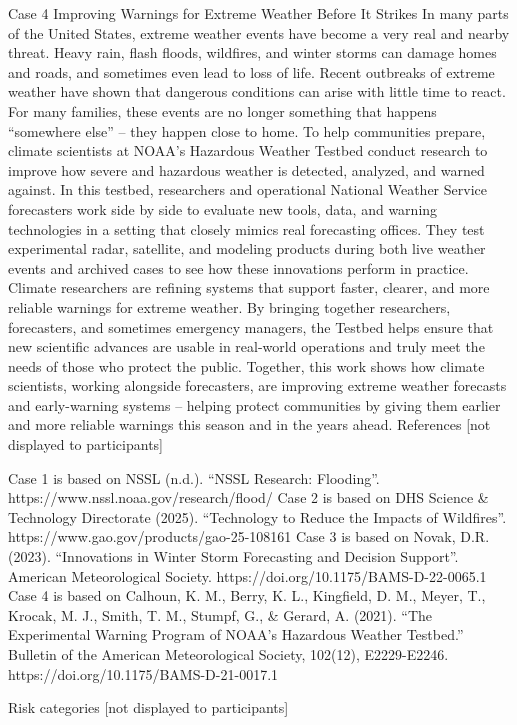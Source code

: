 \documentclass[
  letterpaper,
  DIV=11,
  numbers=noendperiod]{scrartcl}
\begin{document}
Case 4 Improving Warnings for Extreme Weather Before It Strikes In many
parts of the United States, extreme weather events have become a very
real and nearby threat. Heavy rain, flash floods, wildfires, and winter
storms can damage homes and roads, and sometimes even lead to loss of
life. Recent outbreaks of extreme weather have shown that dangerous
conditions can arise with little time to react. For many families, these
events are no longer something that happens ``somewhere else'' -- they
happen close to home. To help communities prepare, climate scientists at
NOAA's Hazardous Weather Testbed conduct research to improve how severe
and hazardous weather is detected, analyzed, and warned against. In this
testbed, researchers and operational National Weather Service
forecasters work side by side to evaluate new tools, data, and warning
technologies in a setting that closely mimics real forecasting offices.
They test experimental radar, satellite, and modeling products during
both live weather events and archived cases to see how these innovations
perform in practice. Climate researchers are refining systems that
support faster, clearer, and more reliable warnings for extreme weather.
By bringing together researchers, forecasters, and sometimes emergency
managers, the Testbed helps ensure that new scientific advances are
usable in real-world operations and truly meet the needs of those who
protect the public. Together, this work shows how climate scientists,
working alongside forecasters, are improving extreme weather forecasts
and early-warning systems -- helping protect communities by giving them
earlier and more reliable warnings this season and in the years ahead.
References {[}not displayed to participants{]}

Case 1 is based on NSSL (n.d.). ``NSSL Research: Flooding''.
https://www.nssl.noaa.gov/research/flood/ Case 2 is based on DHS Science
\& Technology Directorate (2025). ``Technology to Reduce the Impacts of
Wildfires''. https://www.gao.gov/products/gao-25-108161 Case 3 is based
on Novak, D.R. (2023). ``Innovations in Winter Storm Forecasting and
Decision Support''. American Meteorological Society.
https://doi.org/10.1175/BAMS-D-22-0065.1 Case 4 is based on Calhoun, K.
M., Berry, K. L., Kingfield, D. M., Meyer, T., Krocak, M. J., Smith, T.
M., Stumpf, G., \& Gerard, A. (2021). ``The Experimental Warning Program
of NOAA's Hazardous Weather Testbed.'' Bulletin of the American
Meteorological Society, 102(12), E2229-E2246.
https://doi.org/10.1175/BAMS-D-21-0017.1

Risk categories {[}not displayed to participants{]}
\end{document}
